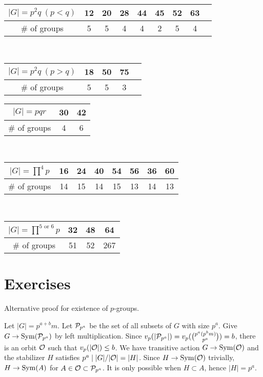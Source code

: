\documentclass{../note}
\begin{document}
\begin{prb}
\end{prb}





\begin{table}[h!]
\centering
\begin{tabular}{c|c|ccccccc}
\hline
$|G|=p^2q\ (p<q)$&12&20&28&44&45&52&63\\
\hline
$\#$ of groups&5&5&4&4&2&5&4\\
\hline
\end{tabular}
\vspace{10pt}\\
\begin{tabular}{c|cccc}
\hline
$|G|=p^2q\ (p>q)$&18&50&75\\
\hline
$\#$ of groups&5&5&3\\
\hline
\end{tabular}
\hspace{10pt}
\begin{tabular}{c|cc}
\hline
$|G|=pqr$&30&42\\
\hline
$\#$ of groups&4&6\\
\hline
\end{tabular}
\vspace{10pt}\\
\begin{tabular}{c|c|cccc|c|c}
\hline
$|G|=\prod^4p$&16&24&40&54&56&36&60\\
\hline
$\#$ of groups&14&15&14&15&13&14&13\\
\hline
\end{tabular}
\vspace{10pt}\\
\begin{tabular}{c|c|c||c}
\hline
$|G|=\prod^{5\text{ or }6}p$&32&48&64\\
\hline
$\#$ of groups&51&52&267\\
\hline
\end{tabular}
\end{table}








\section*{Exercises}
\begin{prb}
Alternative proof for existence of $p$-groups.
\end{prb}
\begin{pf}
Let $|G|=p^{a+b}m$.
Let $\mathcal{P}_{p^a}$ be the set of all subsets of $G$ with size $p^a$.
Give $G\to\operatorname{Sym}(\mathcal{P}_{p^a})$ by left multiplication.
Since $v_p(|\mathcal{P}_{p^a}|)=v_p(\binom{p^a(p^bm)}{p^a})=b$, there is an orbit $\mathcal{O}$ such that $v_p(|\mathcal{O}|)\le b$.
We have transitive action $G\to\operatorname{Sym}(\mathcal{O})$ and the stabilizer $H$ satisfies $p^a\mid|G|/|\mathcal{O}|=|H|$.
Since $H\to\operatorname{Sym}(\mathcal{O})$ trivially, $H\to\operatorname{Sym}(A)$ for $A\in\mathcal{O}\subset\mathcal{P}_{p^a}$.
It is only possible when $H\subset A$, hence $|H|=p^a$.
\end{pf}
\end{document}
